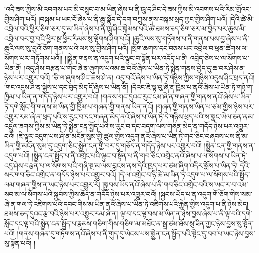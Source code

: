 །འདི་ཟས་ཀྱིས་མི་འབགས་པར་མི་བསྲུང་བ་མ་ཡིན་ཞེས་པ་ནི་ཁྲུ་ད་ཤིང་དེ་ཟས་ཀྱིས་མི་འབགས་པའི་རིམ་གྲོའང་གྱིས་ཤིག་པའོ། །བསྐམ་པ་ཡང་ངོ་ཞེས་པ་ནི་ཆུ་སྣོད་དེ་དག་བཀྲུས་ནས་བསྐམ་སྲད་ཀྱང་གྱིས་ཤིག་པའོ། །དེའི་ཚེ་མི་འབྲེལ་བའི་ཕྱིར་ཅིག་ཅར་དུ་མ་ཡིན་ཞེས་པ་ནི་ཁྲུ་ཤིང་སྐེམས་པའི་ཚེ་ཐམས་ཅད་ཅིག་ཅར་མ་བྱེད་པར་ཆུས་མི་འབྲེལ་བར་བྱ་བའི་ཕྱིར་སྔ་ཕྱིར་རིམས་སུ་ལྷོགས་ཤིག་པའོ། །ཆུའི་ལས་སུ་གཏོགས་པ་ནི་གནས་པས་བྱ་ཞེས་པ་ནི་ཆུའི་ལས་སུ་བྱའོ་ཅོག་གནས་པའི་ལས་སུ་གྱིས་ཤིག་པའོ། །སྲོག་ཆགས་དང་བཅས་པར་འབྲེལ་བ་ཕྲན་ཚེགས་ལ་སོགས་པར་གཏོགས་པའོ།། །།སྨྱེན་གནས་ན་འདུག་པའི་ལྟུང་བ་སྟོན་པར་འདོད་པ་ནི། འབྲིད་ཅེས་པ་ལ་སོགས་པ་ཡིན་ནོ། །འདུ་ཤེས་བརྩན་པ་གང་ཞེ་ན་ཞུགས་པའམ་ཆ་བའོ་ཞེས་པ་ཡིན་ཏེ་སྨྱེན་གནས་བྱེད་དུ་ཆ་བར་ཤེས་ན་ཉེས་པར་འགྱུར་བའོ། །ཅི་ལ་ཞུགས་ཤིང་ཆས་ཤེ་ན། འདུ་བའོ་ཞེས་པ་ཡིན་ཏེ་གཉིས་ཀྱིས་གཉིས་འདུས་ཤིང་ཕྲད་ནའོ། །གང་འདུས་ཤེ་ན་སྐྱེས་པ་དང་བུད་མེད་དོ་ཞེས་པ་ཡིན་ནོ། །དེའང་ཇི་ལྟ་བུ་ཞེ་ན་ཁྱིམ་པ་ནའོ་ཞེས་པ་ཡིན་ཏེ་གཉི་ག་ཁྱིམ་པ་ཡིན་ན་གདོད་ཉེས་པར་འགྱུར་བའོ། །གནས་གང་དུའང་རུང་ངམ་ཞེ་ན་གཞན་གྱི་གནས་ནའོ་ཞེས་པ་ཡིན་ཏེ་དགེ་སློང་གི་གནས་མ་ཡིན་གྱི་ཁྱིམ་པ་གཞན་གྱི་གནས་ཡིན་ནའོ། །གཞན་གྱི་གནས་ཡིན་པ་ཙམ་གྱིས་ཉེས་པར་འགྱུར་རམ་ཞེ་ན་ཕྲད་པའི་ས་རུང་བ་དང་གཞན་མེད་ནའོ་ཞེས་པ་ཡིན་ཏེ་དེ་གཉིས་ཕྲད་པའི་ས་སྣང་ཡེལ་ཅན་ནམ་འདྲུལ་ཟགས་ཀྱིས་མ་ཡིན་ཏེ་སྨྱེན་ངན་སྤྱོད་པའི་ས་རུང་བ་དང་བདག་ལས་གཞན་མེད་ན་གདོད་ཉེས་པར་འགྱུར་བའོ། །ཇི་ལྟར་འདུག་པས་ཤེ་ན་མངོན་སུམ་གྱི་ཚུལ་གྱིས་འདུག་ནའོ་ཞེས་པ་ཡིན་ཏེ་གབ་ཅིང་བཞབས་པས་ནི་མ་ཡིན་གྱི་མངོན་སུམ་དུ་འདུག་ཅིང་སྨྱེན་ངན་གྱི་བར་དུ་གཅོད་ན་གདོད་ཉེས་པར་འགྱུར་བའོ། །སྨྱེན་ངན་གྱི་གནས་ན་འདུག་པའོ། །སྨྱེན་ངན་སྤྱོད་པ་ནི་འགྲེང་པའི་ལྟུང་བ་སྟོན་པ་ནི་གབ་ཅིང་འགྲེང་ནའོ་ཞེས་པ་ལ་སོགས་པ་ཡིན་ཏེ་འདུ་ཤེས་བརྩན་པ་ལ་སོགས་པའི་གཞི་སྔ་མ་ལས་བླངས་ནས་དེའི་ཁྱད་པར་ཙམ་ཞིག་འདིར་སྨོས་པ་ཡིན་ཏེ། དེའི་སར་གབ་ཅིང་འགྲེང་ན་གདོད་ཉེས་པར་འགྱུར་བའོ། །དེ་ལ་འགྲེང་བ་ཉི་ཚེ་མ་ཡིན་ཏེ་འདུག་པ་ལ་སོགས་པའི་སྤྱོད་ལམ་གཞན་གྱིས་ན་ཡང་ཉེས་པར་འགྱུར་རོ། །སྐྱབས་ཡོད་ནའོ་ཞེས་པ་ནི་གབ་ཅིང་འགྲེང་བའི་ས་ཡང་ར་བ་འམ་སབ་མ་ལ་སོགས་པའི་སྐྱབས་ཀྱིས་ཆོད་ན་གདོད་ཉེས་པར་འགྱུར་བའོ། །སྐྱབས་ཡོད་པ་ན་འདུག་གོ་ཅོག་གིས་སམ་ཞེ་ན་གལ་ཏེ་འཇིགས་པའི་དབང་གིས་མ་ཡིན་ནའོ་ཞེས་པ་ཡིན་ཏེ་འཇིགས་པའི་རྐྱེན་གྱིས་འདུག་པ་ནི་ཉེས་མེད། ཐམས་ཅད་དུའང་རྩ་བའི་ཉེས་པར་འགྱུར་རམ་ཞེ་ན། ལྟ་བ་དང་ལྟ་བས་མ་ཡིན་ན་ཉེས་བྱས་ཞེས་པ་ནི་ལྟ་བའི་དགེ་སློང་དང་ལྟ་བའི་སྨྱེན་ངན་སྤྱོད་པ་རྣམས་གཅིག་གིས་གཅིག་མ་མཐོང་ན་སྒྲ་ཙམ་ཐོས་སུ་ཟིན་ཀྱང་ཉེས་བྱས་སུ་སྟོན་པའོ། །གནས་གཞན་དུ་གཏོགས་ནའོ་ཞེས་པ་ནི་གུད་དུ་ཡེངས་པས་སྨྱེན་ངན་སྤྱོད་པའི་སྟེང་དུ་བབ་པ་ཡང་ཉེས་བྱས་སུ་སྟོན་པའོ། །
